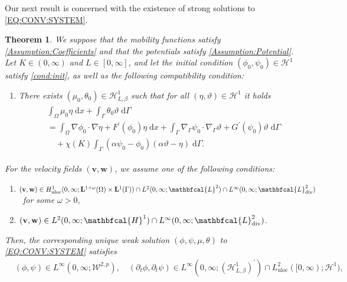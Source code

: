 \documentclass[10pt,reqno]{amsart}
\newtheorem{theorem}{Theorem}[section]
\theoremstyle{remark}
\numberwithin{equation}{section}
\newcommand{\scp}[2]{ ( #1 , #2  )}
\newcommand{\bv}{\mathbf{v}}
\newcommand{\bw}{\mathbf{w}}
\newcommand{\intO}{\int_\Omega}
\newcommand{\intG}{\int_\Gamma}
\newcommand{\dx}{\;\mathrm{d}x}
\newcommand{\dG}{\;\mathrm d\Ga}
\newcommand{\delt}{\partial_{t}}
\newcommand{\Grad}{\nabla}
\newcommand{\Div}{\textnormal{div}}
\newcommand{\Gradg}{\nabla_\Ga}
\newcommand{\Om}{\Omega}
\newcommand{\Ga}{\Gamma}
\begin{document}
Our next result is concerned with the existence of strong solutions to \eqref{EQ:CONV:SYSTEM}.
\begin{theorem}\label{Theorem:CCH:Strong}
    We suppose that the mobility functions satisfy \ref{Assumption:Coefficients} and that the potentials satisfy \ref{Assumption:Potential}. Let $K\in(0,\infty)$ and $L\in[0,\infty]$, and let the initial condition $(\phi_0,\psi_0)\in\mathcal{H}^1$ satisfy \eqref{cond:init}, as well as the following compatibility condition:
    \begin{enumerate}[label=\textnormal{\bfseries(C)},topsep=0ex,leftmargin=*]
    \item \label{cond:MT:0:app} There exists $\scp{\mu_0}{\theta_0}\in\mathcal{H}^1_{L,\beta}$ such that for all $\scp{\eta}{\vartheta}\in\mathcal{H}^1$ it holds
    \begin{align*}
        \begin{aligned}
            &\intO\mu_0\eta\dx + \intG\theta_0\vartheta\dG 
            \\
            &= \intO\Grad\phi_0\cdot\Grad\eta + F^\prime(\phi_0)\eta\dx + \intG\Gradg\psi_0\cdot\Gradg\vartheta + G^\prime(\psi_0)\vartheta\dG 
            \\
            &\quad + \chi(K)\intG(\alpha\psi_0 - \phi_0)(\alpha\vartheta - \eta)\dG.
        \end{aligned}
    \end{align*}
\end{enumerate}
    For the velocity fields $(\bv,\bw)$, we assume one of the following conditions:
    \begin{enumerate}[label=\textnormal{(\roman*)}, topsep=0ex]
        \item \label{Cond:Conv:i} $(\bv,\bw)\in H^1_{\mathrm{uloc}}(0,\infty;\mathbf{L}^{1+\omega}(\Om)\times\mathbf{L}^1(\Ga)) \cap L^2(0,\infty;\mathbfcal{L}^2)\cap L^\infty(0,\infty;\mathbfcal{L}^2_\Div)$ \ for some $\omega > 0$,
        \item \label{Cond:Conv:ii} $(\bv,\bw)\in L^2(0,\infty;\mathbfcal{H}^1)\cap L^\infty(0,\infty;\mathbfcal{L}^2_\Div)$.
    \end{enumerate}
    Then, the corresponding unique weak solution $(\phi,\psi,\mu,\theta)$ to \eqref{EQ:CONV:SYSTEM} satisfies
    \begin{align*}
        &(\phi,\psi)\in L^\infty(0,\infty;\mathcal{W}^{2,p}), \quad (\delt\phi,\delt\psi)\in L^\infty(0,\infty;(\mathcal{H}^1_{L,\beta})^\prime)\cap L^2_{\mathrm{uloc}}([0,\infty);\mathcal{H}^1), \\

\end{align*}
\end{theorem}
\end{document}
